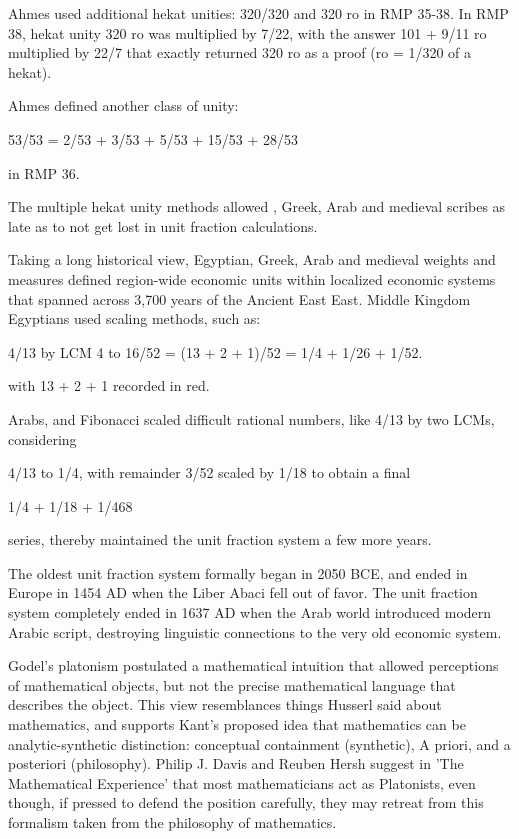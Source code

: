 \documentclass[12pt]{article}
\begin{document}
Ahmes used additional hekat unities:  320/320 and 320 ro in RMP 35-38. In RMP 38, hekat unity 320 ro was multiplied by 7/22, with the answer 101 + 9/11 ro multiplied by 22/7 that exactly returned 320 ro as a proof (ro = 1/320 of a hekat).

Ahmes defined another class of unity: 

53/53 = 2/53 + 3/53 + 5/53 + 15/53 + 28/53 

in RMP 36. 

The multiple hekat unity methods allowed , Greek, Arab and medieval scribes as late as   to not get lost in unit fraction calculations. 

Taking a long historical view, Egyptian, Greek, Arab and medieval weights and measures defined region-wide economic units within localized economic systems that spanned across 3,700 years of the Ancient East East. Middle Kingdom Egyptians used scaling methods, such as:

4/13 by LCM 4 to 16/52 = (13 + 2 + 1)/52 = 1/4 + 1/26 + 1/52. 

with 13 + 2 + 1 recorded in red.

Arabs, and Fibonacci scaled difficult rational numbers, like 4/13 by two LCMs, considering 

4/13 to 1/4, with remainder 3/52 scaled by 1/18 to obtain a final 

1/4 + 1/18 + 1/468 

series, thereby maintained the unit fraction system a few more years.  

The oldest unit fraction system formally began in 2050 BCE, and ended in Europe in 1454 AD when the Liber Abaci fell out of favor. The unit fraction system completely ended in 1637 AD when the Arab world introduced modern Arabic script, destroying linguistic connections to the very old economic system. 

Godel's platonism postulated a mathematical intuition that allowed perceptions of mathematical objects, but not the precise mathematical language that describes the object. This view resemblances things Husserl said about mathematics, and supports Kant's proposed idea that mathematics can be analytic-synthetic distinction: conceptual containment (synthetic), A priori, and a posteriori (philosophy). Philip J. Davis and Reuben Hersh suggest in 'The Mathematical Experience' that most mathematicians act as Platonists, even though, if pressed to defend the position carefully, they may retreat from this formalism taken from the philosophy of mathematics.
\end{document}
